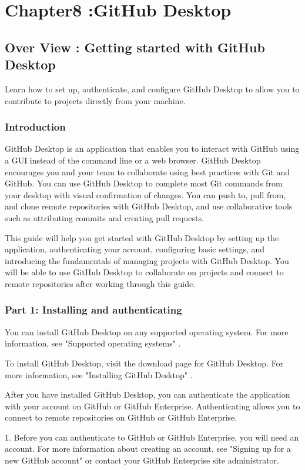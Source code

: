 \section{Chapter8 :GitHub Desktop} 


\subsection{ Over View : Getting started with GitHub Desktop }
Learn how to set up, authenticate, and configure GitHub Desktop to allow you to contribute to projects directly from your machine.

\subsubsection{ Introduction}
GitHub Desktop is an application that enables you to interact with GitHub using a GUI instead of the command line or a web browser. GitHub Desktop encourages you and your team to collaborate using best practices with Git and GitHub. You can use GitHub Desktop to complete most Git commands from your desktop with visual confirmation of changes. You can push to, pull from, and clone remote repositories with GitHub Desktop, and use collaborative tools such as attributing commits and creating pull requests.

This guide will help you get started with GitHub Desktop by setting up the application, authenticating your account, configuring basic settings, and introducing the fundamentals of managing projects with GitHub Desktop. You will be able to use GitHub Desktop to collaborate on projects and connect to remote repositories after working through this guide.

\subsubsection{Part 1: Installing and authenticating}
You can install GitHub Desktop on any supported operating system. For more information, see "Supported operating systems" .

To install GitHub Desktop, visit the download page for GitHub Desktop. For more information, see "Installing GitHub Desktop" .

After you have installed GitHub Desktop, you can authenticate the application with your account on GitHub or GitHub Enterprise. Authenticating allows you to connect to remote repositories on GitHub or GitHub Enterprise.

1.	Before you can authenticate to GitHub or GitHub Enterprise, you will need an account. For more information about creating an account, see "Signing up for a new GitHub account" or contact your GitHub Enterprise site administrator.


